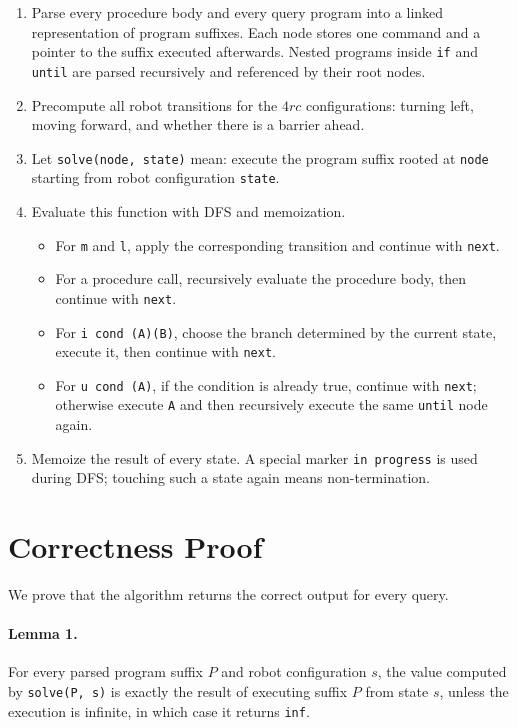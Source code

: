 \documentclass[11pt]{article}
\begin{document}
\begin{enumerate}[leftmargin=*]
    \item Parse every procedure body and every query program into a linked representation of program
    suffixes. Each node stores one command and a pointer to the suffix executed afterwards.
    Nested programs inside \texttt{if} and \texttt{until} are parsed recursively and referenced by their root nodes.
    \item Precompute all robot transitions for the $4rc$ configurations:
    turning left, moving forward, and whether there is a barrier ahead.
    \item Let \texttt{solve(node, state)} mean: execute the program suffix rooted at \texttt{node} starting
    from robot configuration \texttt{state}.
    \item Evaluate this function with DFS and memoization.
    \begin{itemize}[leftmargin=*]
        \item For \texttt{m} and \texttt{l}, apply the corresponding transition and continue with \texttt{next}.
        \item For a procedure call, recursively evaluate the procedure body, then continue with \texttt{next}.
        \item For \texttt{i cond (A)(B)}, choose the branch determined by the current state, execute it,
        then continue with \texttt{next}.
        \item For \texttt{u cond (A)}, if the condition is already true, continue with \texttt{next};
        otherwise execute \texttt{A} and then recursively execute the same \texttt{until} node again.
    \end{itemize}
    \item Memoize the result of every state. A special marker \texttt{in progress} is used during DFS;
    touching such a state again means non-termination.
\end{enumerate}

\section*{Correctness Proof}

We prove that the algorithm returns the correct output for every query.

\paragraph{Lemma 1.}
For every parsed program suffix $P$ and robot configuration $s$, the value computed by
\texttt{solve(P, s)} is exactly the result of executing suffix $P$ from state $s$, unless the execution is
infinite, in which case it returns \texttt{inf}.
\end{document}
